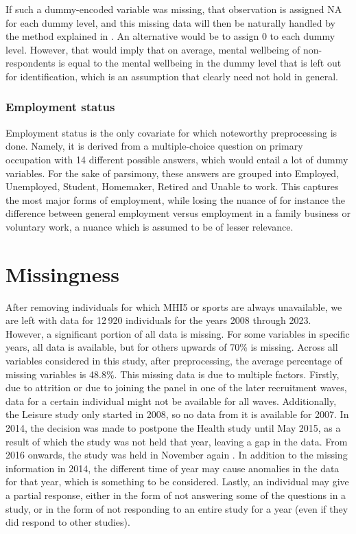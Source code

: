 If such a dummy-encoded variable was missing, that observation is assigned NA for each dummy level, and this missing
data will then be naturally handled by the method explained in .
An alternative would be to assign 0 to each dummy level. However, that would imply that on average, mental wellbeing of non-respondents
is equal to the mental wellbeing in the dummy level that is left out for identification, which is an assumption that
clearly need not hold in general.

\subsubsection{Employment status}
Employment status is the only covariate for which noteworthy preprocessing is done.
Namely, it is derived from a multiple-choice question on primary occupation with 14 different possible answers,
which would entail a lot of dummy variables.
For the sake of parsimony, these answers are grouped into Employed, Unemployed, Student, Homemaker, Retired and
Unable to work. This captures the most major forms of employment, while losing the nuance of for instance
the difference between general employment versus employment in a family business or voluntary work, a nuance which
is assumed to be of lesser relevance.

\section{Missingness}
\label{sec:data:missingness}
After removing individuals for which MHI5 or sports are always unavailable, we are left with data for 12\,920 individuals
for the years 2008 through 2023.
However, a significant portion of all data is missing. For some variables in specific years, all data is available,
but for others upwards of 70\% is missing. Across all variables considered in this study, after preprocessing,
the average percentage of missing variables is 48.8\%.
This missing data is due to multiple factors. Firstly, due to attrition or due to joining the panel
in one of the later recruitment waves, data for a certain individual might not be available for all waves.
Additionally, the Leisure study only started in 2008, so no data from it is available for 2007.
In 2014, the decision was made to postpone the Health study until May 2015, as a result of which the study was not held
that year, leaving a gap in the data. From 2016 onwards, the study was held in November again \cite{marchand2025personal}.
In addition to the missing information in 2014, the different time of year may cause anomalies in the data for that year,
which is something to be considered.
Lastly, an individual may give a partial response, either in the form of not answering some of the questions in a study,
or in the form of not responding to an entire study for a year (even if they did respond to other studies).

